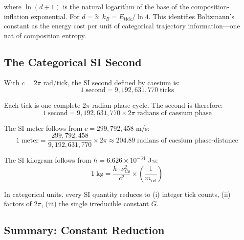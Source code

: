 \documentclass[twocolumn,10pt,a4paper]{article}
\theoremstyle{definition}
\theoremstyle{remark}
\begin{document}
where $\ln(d+1)$ is the natural logarithm of the base of the composition-inflation exponential. For $d = 3$: $k_B = E_{\text{tick}} / \ln 4$. This identifies Boltzmann's constant as the energy cost per unit of categorical trajectory information---one nat of composition entropy.

\subsection{The Categorical SI Second}

With $c = 2\pi$ rad/tick, the SI second defined by caesium is:
\begin{equation}
1\;\text{second} = 9{,}192{,}631{,}770\;\text{ticks}
\label{eq:si_second}
\end{equation}

Each tick is one complete $2\pi$-radian phase cycle. The second is therefore:
\begin{equation}
1\;\text{second} = 9{,}192{,}631{,}770 \times 2\pi\;\text{radians of caesium phase}
\label{eq:second_radians}
\end{equation}

The SI meter follows from $c = 299{,}792{,}458$ m/s:
\begin{equation}
1\;\text{meter} = \frac{299{,}792{,}458}{9{,}192{,}631{,}770} \times 2\pi \approx 204.89\;\text{radians of caesium phase-distance}
\label{eq:meter_radians}
\end{equation}

The SI kilogram follows from $h = 6.626 \times 10^{-34}$ J$\cdot$s:
\begin{equation}
1\;\text{kg} = \frac{h \cdot \nu_{\text{Cs}}^2}{c^2} \times \left(\frac{1}{m_{\text{ref}}}\right)
\label{eq:kg_angular}
\end{equation}

In categorical units, every SI quantity reduces to (i) integer tick counts, (ii) factors of $2\pi$, (iii) the single irreducible constant $G$.

\subsection{Summary: Constant Reduction}
\end{document}
